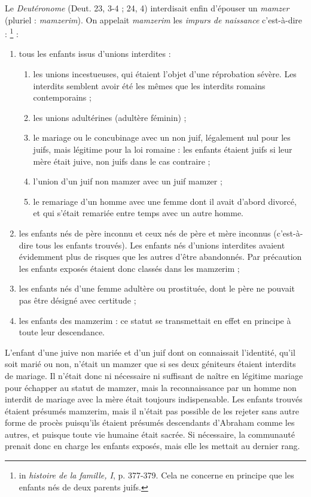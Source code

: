  Le \emph{Deutéronome} (Deut. 23, 3-4 ; 24, 4) interdisait enfin d'épouser un \emph{mamzer} (pluriel : \emph{mamzerim}). On appelait \emph{mamzerim} les \emph{impurs de naissance}  c'est-à-dire :%
% 
\footnote{in \emph{histoire de la famille, I}, p. 377-379. Cela ne concerne en principe que les enfants nés de deux parents juifs.}%
 :
\begin{enumerate}
\item tous les enfants issus d'unions interdites :
 \begin{enumerate}
 \item les unions incestueuses, qui étaient l'objet d'une réprobation sévère. Les interdits semblent avoir été les mêmes que les interdits romains contemporains ;
 \item les unions adultérines (adultère féminin) ;
 \item le mariage ou le concubinage avec un non juif, légalement nul pour les juifs, mais légitime pour la loi romaine : les enfants étaient juifs si leur mère était juive, non juifs dans le cas contraire ;
 \item l'union d'un juif non mamzer avec un juif mamzer ;
 \item le remariage d'un homme avec une femme dont il avait d'abord divorcé, et qui s'était remariée entre temps avec un autre homme.
\end{enumerate}
\item les enfants nés de père inconnu et ceux nés de père et mère inconnus (c'est-à-dire tous les enfants trouvés). Les enfants nés d'unions interdites avaient évidemment plus de risques que les autres d'être abandonnés. Par précaution les enfants exposés étaient donc classés dans les mamzerim ;
\item les enfants nés d'une femme adultère ou prostituée, dont le père ne pouvait pas être désigné avec certitude ;
\item les enfants des mamzerim : ce statut se transmettait en effet en principe à toute leur descendance. 
\end{enumerate}

 L'enfant d'une juive non mariée et d'un juif dont on connaissait l'identité, qu'il soit marié ou non, n'était un mamzer que si ses deux géniteurs étaient interdits de mariage. Il n'était donc ni nécessaire ni suffisant de naître en légitime mariage pour échapper au statut de mamzer, mais la reconnaissance par un homme non interdit de mariage avec la mère était toujours indispensable. Les enfants trouvés étaient présumés mamzerim, mais il n'était pas possible de les rejeter sans autre forme de procès puisqu'ils étaient présumés descendants d'Abraham comme les autres, et puisque toute vie humaine était sacrée. Si nécessaire, la communauté prenait donc en charge les enfants exposés, mais elle les mettait au dernier rang.

